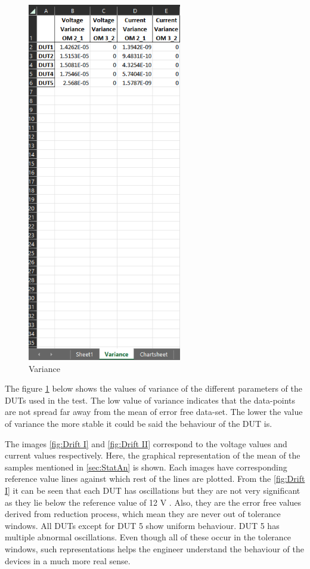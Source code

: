 \begin{figure}[htbp]
    	\centering
    	\includegraphics[width= 0.6\textwidth]{images/Variance.png}
    	\caption [Variance]{Variance}  
    	\label{fig:Variance}
\end{figure}

The figure \ref{fig:Variance} below shows the values of variance of the different parameters of the DUTs used in the test. The low value of variance indicates that the data-points are not spread far away from the mean of error free data-set. The lower the value of variance the more stable it could be said the behaviour of the DUT is. 

The images \ref{fig:Drift I} and \ref{fig:Drift II} correspond to the voltage values and current values respectively. Here, the graphical representation of the mean of the samples mentioned in \ref{sec:StatAn} is shown. Each images have corresponding reference value lines against which rest of the lines are plotted. From the \ref{fig:Drift I} it can be seen that each DUT has oscillations but they are not very significant as they lie below the reference value of 12 V . Also, they are the error free values derived from reduction process, which mean they are never out of tolerance windows. All DUTs except for DUT 5 show uniform behaviour. DUT 5 has multiple abnormal oscillations. Even though all of these occur in the tolerance windows, such representations helps the engineer understand the behaviour of the devices in a much more real sense. 

